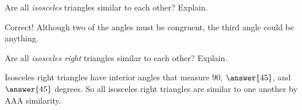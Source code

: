 \documentclass[nooutcomes]{ximera}
\begin{document}
\begin{question}Are all \emph{isosceles} triangles similar to each other? 
 Explain.  
\begin{question}
Correct!  Although two of the angles must be congruent, the third angle could be anything. 

Are all \emph{isosceles right} triangles similar to each other? 
 Explain.  
\begin{question}
Isosceles right triangles have interior angles that measure $90$, $\answer{45}$, and $\answer{45}$ degrees.  So all isosceles right triangles are similar to one another by AAA similarity.  
\end{question}
\end{question}
\end{question}
\end{document}
